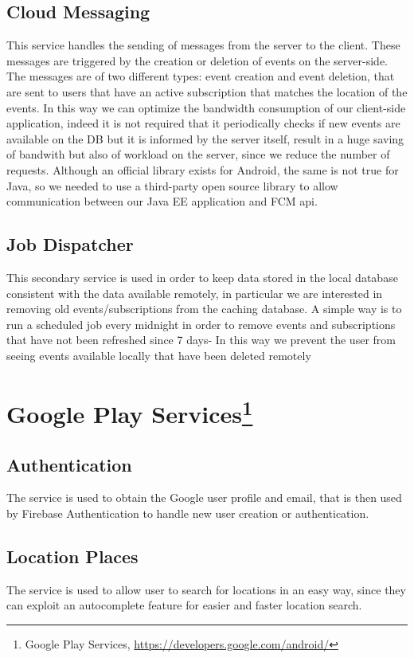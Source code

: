 \documentclass[a4paper]{scrreprt}
\begin{document}
\subsection{Cloud Messaging}
This service handles the sending of messages from the server to the client. These messages are triggered by the creation or deletion of events on the server-side. The messages are of two different types: event creation and event deletion, that are sent to users that have an active subscription that matches the location of the events. In this way we can optimize the bandwidth consumption of our client-side application, indeed it is not required that it periodically checks if new events are available on the DB but it is informed by the server itself, result in a huge saving of bandwith but also of workload on the server, since we reduce the number of requests. Although an official library exists for Android, the same is not true for Java, so we needed to use a third-party open source library to allow communication between our Java EE application and FCM api.

\subsection{Job Dispatcher}
This secondary service is used in order to keep data stored in the local database consistent with the data available remotely, in particular we are interested in removing old events/subscriptions from the caching database. A simple way is to run a scheduled job every midnight in order to remove events and subscriptions that have not been refreshed since 7 days- In this way we prevent the user from seeing events available locally that have been deleted remotely

\section[Google Play Services]{Google Play Services\footnote{Google Play Services, \url{https://developers.google.com/android/}}}
\subsection{Authentication}
The service is used to obtain the Google user profile and email, that is then used by Firebase Authentication to handle new user creation or authentication.

\subsection{Location Places}
The service is used to allow user to search for locations in an easy way, since they can exploit an autocomplete feature for easier and faster location search.
\end{document}
